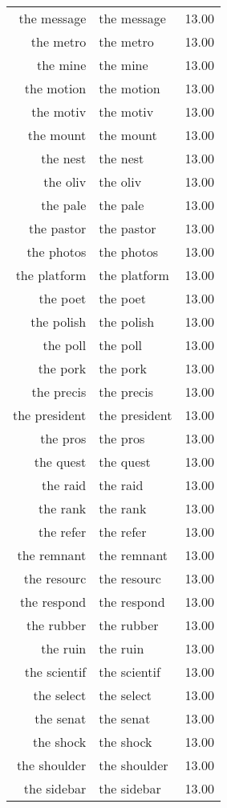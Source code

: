 \begin{table}[ht]
\begin{tabular}{rlr}
  the message & the message & 13.00 \\ 
  the metro & the metro & 13.00 \\ 
  the mine & the mine & 13.00 \\ 
  the motion & the motion & 13.00 \\ 
  the motiv & the motiv & 13.00 \\ 
  the mount & the mount & 13.00 \\ 
  the nest & the nest & 13.00 \\ 
  the oliv & the oliv & 13.00 \\ 
  the pale & the pale & 13.00 \\ 
  the pastor & the pastor & 13.00 \\ 
  the photos & the photos & 13.00 \\ 
  the platform & the platform & 13.00 \\ 
  the poet & the poet & 13.00 \\ 
  the polish & the polish & 13.00 \\ 
  the poll & the poll & 13.00 \\ 
  the pork & the pork & 13.00 \\ 
  the precis & the precis & 13.00 \\ 
  the president & the president & 13.00 \\ 
  the pros & the pros & 13.00 \\ 
  the quest & the quest & 13.00 \\ 
  the raid & the raid & 13.00 \\ 
  the rank & the rank & 13.00 \\ 
  the refer & the refer & 13.00 \\ 
  the remnant & the remnant & 13.00 \\ 
  the resourc & the resourc & 13.00 \\ 
  the respond & the respond & 13.00 \\ 
  the rubber & the rubber & 13.00 \\ 
  the ruin & the ruin & 13.00 \\ 
  the scientif & the scientif & 13.00 \\ 
  the select & the select & 13.00 \\ 
  the senat & the senat & 13.00 \\ 
  the shock & the shock & 13.00 \\ 
  the shoulder & the shoulder & 13.00 \\ 
  the sidebar & the sidebar & 13.00 \\ 

\end{tabular}
\end{table}

